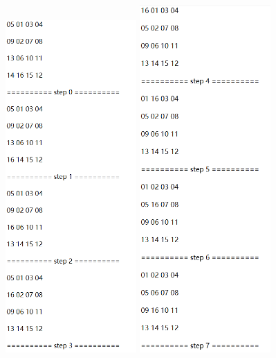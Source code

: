 \documentclass[a4paper, 11pt]{article}
\begin{document}
\begin{figure}[ht]
\includegraphics[width=5cm]{Pic/ex1}
\includegraphics[width=5cm]{Pic/ex2}

\end{figure}
\end{document}
